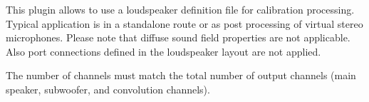 This plugin allows to use a loudspeaker definition file for
calibration processing. Typical application is in a standalone route
or as post processing of virtual stereo microphones. Please note that
diffuse sound field properties are not applicable. Also port
connections defined in the loudspeaker layout are not applied.

The number of channels must match the total number of output channels
(main speaker, subwoofer, and convolution channels).



